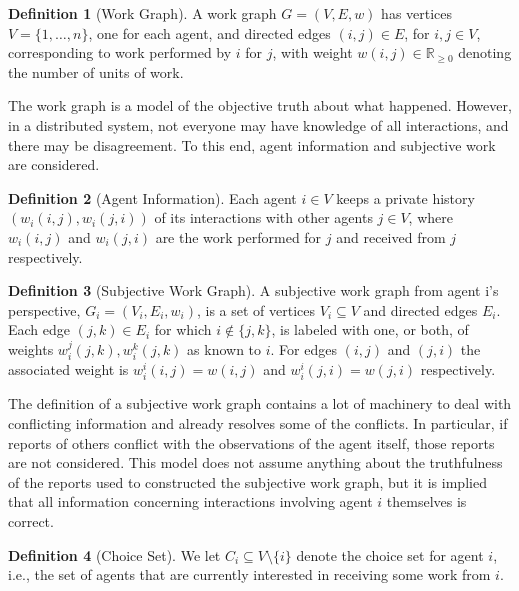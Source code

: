 \documentclass[a4paper,11pt]{book}
\newcommand{\bb}{\mathbb}
\theoremstyle{definition}
\newtheorem{definition}{Definition}
\begin{document}
\begin{definition}[Work Graph]
    A work graph $G = (V, E, w)$ has vertices $V = \{1, \ldots, n\}$, one for each agent, and directed
    edges $(i, j) \in E$, for $i, j \in V$, corresponding to work performed by $i$ for $j$, with weight
    $w(i,j) \in \bb{R}_{\geq0}$ denoting the number of units of work.
    \label{def:work_graph}
\end{definition}

The work graph is a model of the objective truth about what happened. However, in a distributed system,
not everyone may have knowledge of all interactions, and there may be disagreement. To this end, agent
information and subjective work are considered.

\begin{definition}[Agent Information]
   Each agent $i \in V$ keeps a private history $(w_i(i,j), w_i(j, i))$ of its interactions with
   other agents $j \in V$, where $w_i(i,j)$ and $w_i(j,i)$ are the work performed for $j$ and
   received from $j$ respectively.
\end{definition}

\begin{definition}[Subjective Work Graph]
   A subjective work graph from agent i's perspective, $G_i = (V_i, E_i, w_i)$, is a set of vertices
   $V_i \subseteq V$ and directed edges $E_i$. Each edge $(j, k) \in E_i$ for which $i \notin \{j, k\}$,
   is labeled with one, or both, of weights $w^j_i(j, k), w_i^k(j, k)$ as known to $i$. For edges $(i,j)$
   and $(j,i)$ the associated weight is $w_i^i(i,j) = w(i,j)$ and $w_i^i(j, i) = w(j,i)$ respectively.
\end{definition}

The definition of a subjective work graph contains a lot of machinery to deal with conflicting information
and already resolves some of the conflicts. In particular, if reports of others conflict with the observations
of the agent itself, those reports are not considered. This model does not assume anything about the truthfulness
of the reports used to constructed the subjective work graph, but it is implied that all information concerning
interactions involving agent $i$ themselves is correct.

\begin{definition}[Choice Set]
    We let $C_i \subseteq V \setminus \{i\}$ denote the choice set for agent $i$, i.e., the set of agents that
    are currently interested in receiving some work from $i$.
    \label{def:choice_set}
\end{definition}
\end{document}
